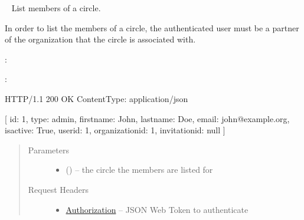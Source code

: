\documentclass[letterpaper,10pt,english]{sphinxmanual}
\begin{document}
\begin{fulllineitems}
\label{\detokenize{resources/circle:get--circles-(circle_id)-members}}~
List members of a circle.

In order to list the members of a circle, the authenticated user must
be a partner of the organization that the circle is associated with.

:

\begin{sphinxVerbatim}[commandchars=\\\{\}]
  
 
 
\end{sphinxVerbatim}

:

\begin{sphinxVerbatim}[commandchars=\\\{\}]
HTTP/1.1 200 OK
Content\PYGZhy{}Type: application/json

[
    \PYGZob{}
        \PYGZsq{}id\PYGZsq{}: 1,
        \PYGZsq{}type\PYGZsq{}: \PYGZsq{}admin\PYGZsq{},
        \PYGZsq{}firstname\PYGZsq{}: \PYGZsq{}John\PYGZsq{},
        \PYGZsq{}lastname\PYGZsq{}: \PYGZsq{}Doe\PYGZsq{},
        \PYGZsq{}email\PYGZsq{}: \PYGZsq{}john@example.org\PYGZsq{},
        \PYGZsq{}is\PYGZus{}active\PYGZsq{}: True,
        \PYGZsq{}user\PYGZus{}id\PYGZsq{}: 1,
        \PYGZsq{}organization\PYGZus{}id\PYGZsq{}: 1,
        \PYGZsq{}invitation\PYGZus{}id\PYGZsq{}: null
    \PYGZcb{}
]
\end{sphinxVerbatim}
\begin{quote}\begin{description}
\item[{Parameters}] \leavevmode\begin{itemize}
\item {} 
 () -- the circle the members are listed for

\end{itemize}

\item[{Request Headers}] \leavevmode\begin{itemize}
\item {} 
\href{http://tools.ietf.org/html/rfc7235\#section-4.2}{Authorization} -- JSON Web Token to authenticate


\end{itemize}
\end{description}
\end{quote}
\end{fulllineitems}
\end{document}
